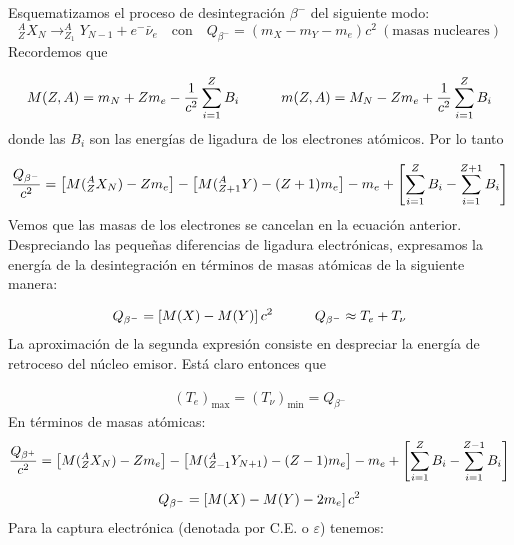 Esquematizamos el proceso de desintegración $\beta^-$ del siguiente modo:
\begin{equation}
	^A_Z X_N \longrightarrow _{Z_1}^A Y_{N-1} + e^- \bar{\nu}_e \quad \text{con} \quad Q_{\beta^-} = (m_X-m_Y-m_e)c^2 \ (\text{masas nucleares})
\end{equation}
Recordemos que

\begin{equation*}
	M(Z,A) = m_N + Zm_e - \frac{1}{c^2} \sum_{i=1}^Z B_i \quad \quad \quad
	m(Z,A) = M_N - Zm_e + \frac{1}{c^2} \sum_{i=1}^Z B_i
\end{equation*}
donde las $B_i$ son las energías de ligadura de los electrones atómicos. Por lo tanto

\begin{eqnarray}
	\frac{Q_{\beta^-}}{c^2} = \left[ M(^A_ZX_N) - Zm_e \right] - \left[ M(_{Z+1}^A Y)-(Z+1)m_e \right]  - m_e + \left[ \sum_{i=1}^{Z} B_i - \sum_{i=1}^{Z+1} B_i \right]
\end{eqnarray}
Vemos que las masas de los electrones se cancelan en la ecuación anterior. Despreciando las pequeñas diferencias de ligadura electrónicas, expresamos la energía de la desintegración en términos de masas atómicas de la siguiente manera:

\begin{eqnarray}
	Q_ {\beta^-} = \left[ M(X)-M(Y) \right] c^2 \quad \quad \quad Q_{\beta^-} \approx T_e + T_\nu
\end{eqnarray}
La aproximación de la segunda expresión consiste en despreciar la energía de retroceso del núcleo emisor. Está claro entonces que

\begin{eqnarray}
	(T_e)_{\max} = (T_\nu)_{\min} = Q_{\beta^-}
\end{eqnarray}
En términos de masas atómicas:
\begin{eqnarray}
	\frac{Q_{\beta^+}}{c^2} = \left[ M(^A_ZX_N) - Zm_e \right] - \left[ M(_{Z-1}^A Y_ {N+1})-(Z-1)m_e \right]  - m_e + \left[ \sum_{i=1}^{Z} B_i - \sum_{i=1}^{Z-1} B_i \right]
\end{eqnarray}
\begin{eqnarray}
	Q_ {\beta^-} = \left[ M(X)-M(Y)-2m_e \right] c^2 
\end{eqnarray}
Para la captura electrónica (denotada por C.E. o $\varepsilon$) tenemos:

